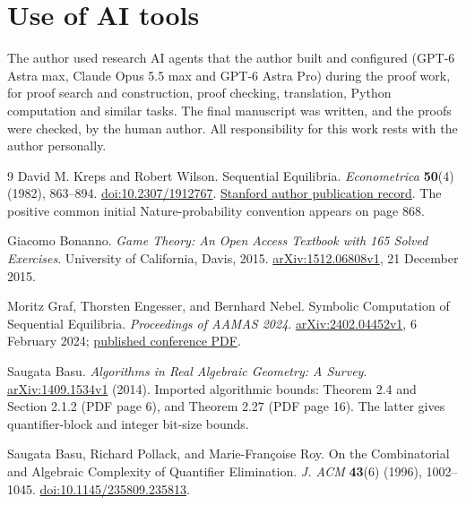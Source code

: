 \documentclass[11pt,a4paper]{article}
\numberwithin{equation}{section}
\theoremstyle{definition}
\begin{document}
\section*{Use of AI tools}
The author used research AI agents that the author built and configured (GPT-6 Astra max,
Claude Opus 5.5 max and GPT-6 Astra Pro) during the proof work, for proof search and
construction, proof checking, translation, Python computation and similar tasks. The final
manuscript was written, and the proofs were checked, by the human author. All responsibility
for this work rests with the author personally.

\begin{thebibliography}{9}
David M. Kreps and Robert Wilson.
\newblock Sequential Equilibria.
\newblock \emph{Econometrica} \textbf{50}(4) (1982), 863--894.
\newblock \href{https://doi.org/10.2307/1912767}{doi:10.2307/1912767}.
\newblock \href{https://www.gsb.stanford.edu/faculty-research/publications/sequential-equilibrium}
{Stanford author publication record}.
\newblock The positive common initial Nature-probability convention
appears on page 868.

Giacomo Bonanno.
\newblock \emph{Game Theory: An Open Access Textbook with 165 Solved
Exercises}.
\newblock University of California, Davis, 2015.
\newblock \href{https://arxiv.org/abs/1512.06808v1}{arXiv:1512.06808v1},
21 December 2015.

Moritz Graf, Thorsten Engesser, and Bernhard Nebel.
\newblock Symbolic Computation of Sequential Equilibria.
\newblock \emph{Proceedings of AAMAS 2024}.
\newblock \href{https://arxiv.org/html/2402.04452v1}
{arXiv:2402.04452v1}, 6 February 2024;
\href{https://www.ifaamas.org/Proceedings/aamas2024/pdfs/p715.pdf}
{published conference PDF}.

Saugata Basu.
\newblock \emph{Algorithms in Real Algebraic Geometry: A Survey}.
\newblock \href{https://arxiv.org/pdf/1409.1534v1}
{arXiv:1409.1534v1} (2014).
\newblock Imported algorithmic bounds: Theorem 2.4 and
Section 2.1.2 (PDF page 6), and Theorem 2.27 (PDF page 16).
The latter gives quantifier-block and integer bit-size bounds.

Saugata Basu, Richard Pollack, and Marie-Fran\c{c}oise Roy.
\newblock On the Combinatorial and Algebraic Complexity of Quantifier
Elimination.
\newblock \emph{J. ACM} \textbf{43}(6) (1996), 1002--1045.
\newblock \href{https://doi.org/10.1145/235809.235813}{doi:10.1145/235809.235813}.


\end{thebibliography}
\end{document}
